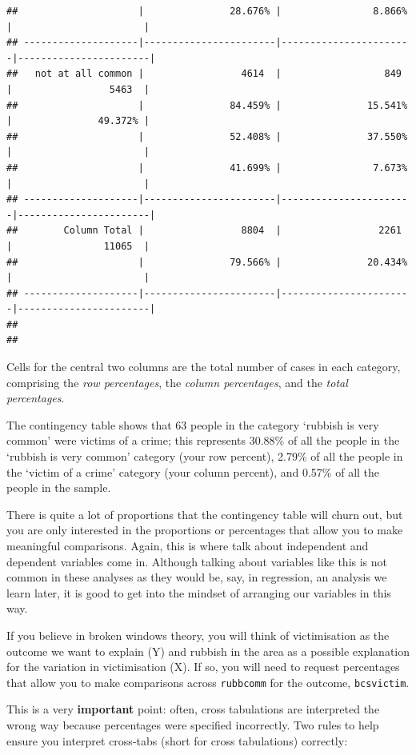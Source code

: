 \documentclass[
]{book}
\begin{document}
\begin{verbatim}
##                     |               28.676% |                8.866% |                       | 
## --------------------|-----------------------|-----------------------|-----------------------|
##   not at all common |                 4614  |                  849  |                 5463  | 
##                     |               84.459% |               15.541% |               49.372% | 
##                     |               52.408% |               37.550% |                       | 
##                     |               41.699% |                7.673% |                       | 
## --------------------|-----------------------|-----------------------|-----------------------|
##        Column Total |                 8804  |                 2261  |                11065  | 
##                     |               79.566% |               20.434% |                       | 
## --------------------|-----------------------|-----------------------|-----------------------|
## 
## 
\end{verbatim}

Cells for the central two columns are the total number of cases in each category, comprising the \emph{row percentages}, the \emph{column percentages}, and the \emph{total percentages}.

The contingency table shows that 63 people in the category `rubbish is very common' were victims of a crime; this represents 30.88\% of all the people in the `rubbish is very common' category (your row percent), 2.79\% of all the people in the `victim of a crime' category (your column percent), and 0.57\% of all the people in the sample.

There is quite a lot of proportions that the contingency table will churn out, but you are only interested in the proportions or percentages that allow you to make meaningful comparisons. Again, this is where talk about independent and dependent variables come in. Although talking about variables like this is not common in these analyses as they would be, say, in regression, an analysis we learn later, it is good to get into the mindset of arranging our variables in this way.

If you believe in broken windows theory, you will think of victimisation as the outcome we want to explain (Y) and rubbish in the area as a possible explanation for the variation in victimisation (X). If so, you will need to request percentages that allow you to make comparisons across \texttt{rubbcomm} for the outcome, \texttt{bcsvictim}.

This is a very \textbf{important} point: often, cross tabulations are interpreted the wrong way because percentages were specified incorrectly. Two rules to help ensure you interpret cross-tabs (short for cross tabulations) correctly:
\end{document}
